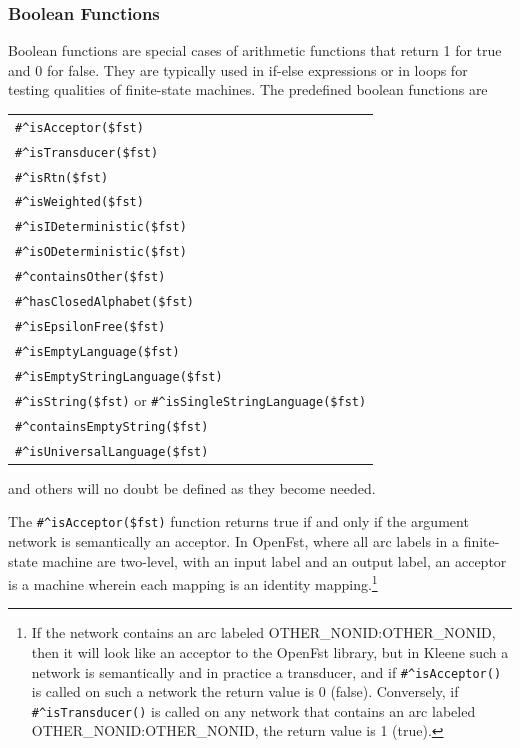 \documentclass[letterpaper,12pt]{article}
\begin{document}
\vspace{0.5cm}

\subsubsection{Boolean Functions}

Boolean functions are special cases of arithmetic functions that return 1 for true and 0 for false.  They
are typically used in if-else expressions or in loops for testing qualities of finite-state machines.
The predefined boolean functions are 

\vspace{0.5cm}

\noindent
\begin{tabular}{|l|}
\hline
\verb!#^isAcceptor($fst)! \\
\verb!#^isTransducer($fst)! \\
\verb!#^isRtn($fst)! \\
\hline
\verb!#^isWeighted($fst)! \\
\verb!#^isIDeterministic($fst)! \\
\verb!#^isODeterministic($fst)! \\
\verb!#^containsOther($fst)! \\
\verb!#^hasClosedAlphabet($fst)! \\
\verb!#^isEpsilonFree($fst)! \\
\hline
\verb!#^isEmptyLanguage($fst)! \\
\verb!#^isEmptyStringLanguage($fst)! \\
\verb!#^isString($fst)! or \verb!#^isSingleStringLanguage($fst)!\\
\verb!#^containsEmptyString($fst)! \\
\verb!#^isUniversalLanguage($fst)! \\
\hline
\end{tabular}

\vspace{0.5cm}
\noindent
and others will no doubt be defined as they become needed.

The \verb!#^isAcceptor($fst)! function returns true if and only if the
argument network is semantically an
acceptor.  In OpenFst, where all arc labels in a finite-state machine
are two-level, with an input label and an output label, an acceptor is a
machine wherein each mapping is an identity mapping.\footnote{If the network contains an arc labeled
OTHER\_NONID:OTHER\_NONID, then it will look like an acceptor to the OpenFst library, but in Kleene such
a network is semantically and in practice a transducer, and if \verb!#^isAcceptor()! is called on such
a network the return value is 0 (false).  Conversely, if
\verb!#^isTransducer()! is called on any network that
contains an arc labeled OTHER\_NONID:OTHER\_NONID, the return value is 1 (true).}
\end{document}
